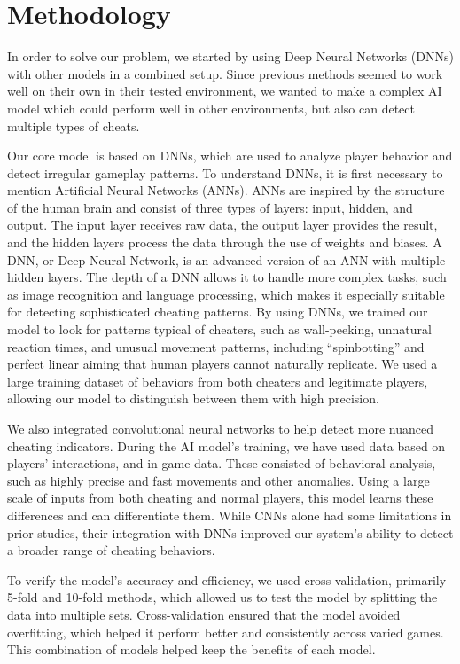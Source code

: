 \section{Methodology}
\label{ch:methodology}

In order to solve our problem, we started by using Deep Neural Networks (DNNs) with other models in a combined setup. Since previous methods seemed to work well on their own in their tested environment, we wanted to make a complex AI model which could perform well in other environments, but also can detect multiple types of cheats.

Our core model is based on DNNs, which are used to analyze player behavior and detect irregular gameplay patterns. To understand DNNs, it is first necessary to mention Artificial Neural Networks (ANNs). ANNs are inspired by the structure of the human brain and consist of three types of layers: input, hidden, and output. The input layer receives raw data, the output layer provides the result, and the hidden layers process the data through the use of weights and biases. A DNN, or Deep Neural Network, is an advanced version of an ANN with multiple hidden layers. The depth of a DNN allows it to handle more complex tasks, such as image recognition and language processing, which makes it especially suitable for detecting sophisticated cheating patterns. By using DNNs, we trained our model to look for patterns typical of cheaters, such as wall-peeking, unnatural reaction times, and unusual movement patterns, including “spinbotting” and perfect linear aiming that human players cannot naturally replicate. We used a large training dataset of behaviors from both cheaters and legitimate players, allowing our model to distinguish between them with high precision.

We also integrated convolutional neural networks to help detect more nuanced cheating indicators. During the AI model's training, we have used data based on players' interactions, and in-game data. These consisted of behavioral analysis, such as highly precise and fast movements and other anomalies. Using a large scale of inputs from both cheating and normal players, this model learns these differences and can differentiate them. While CNNs alone had some limitations in prior studies, their integration with DNNs improved our system’s ability to detect a broader range of cheating behaviors.

To verify the model’s accuracy and efficiency, we used cross-validation, primarily 5-fold and 10-fold methods, which allowed us to test the model by splitting the data into multiple sets. Cross-validation ensured that the model avoided overfitting, which helped it perform better and consistently across varied games. This combination of models helped keep the benefits of each model.

